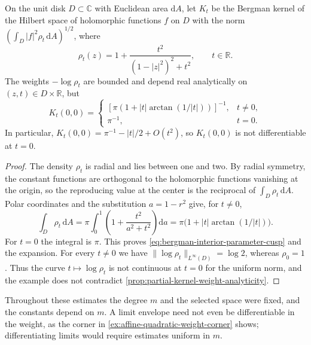 \begin{example}\label{ex:bergman-interior-parameter-cusp}
On the unit disk $D\subset\mathbb C$ with Euclidean area $\mathrm{d}A$, let $K_t$ be the Bergman kernel of the Hilbert space of holomorphic functions $f$ on $D$ with the norm $(\int_D|f|^2\rho_t\,\mathrm{d}A)^{1/2}$, where
\[
 \rho_t(z)=1+\frac{t^2}{(1-|z|^2)^2+t^2},\qquad t\in\mathbb R.
\]
The weights $-\log\rho_t$ are bounded and depend real analytically on $(z,t)\in D\times\mathbb R$, but
\begin{equation}\label{eq:bergman-interior-parameter-cusp}
 K_t(0,0)=
 \begin{cases}
 [\pi(1+|t|\arctan(1/|t|))]^{-1},&t\ne0,\\
 \pi^{-1},&t=0.
 \end{cases}
\end{equation}
In particular, $K_t(0,0)=\pi^{-1}-|t|/2+O(t^2)$, so $K_t(0,0)$ is not differentiable at $t=0$.
\end{example}
\begin{proof}
The density $\rho_t$ is radial and lies between one and two. By radial symmetry, the constant functions are orthogonal to the holomorphic functions vanishing at the origin, so the reproducing value at the center is the reciprocal of $\int_D\rho_t\,\mathrm{d}A$. Polar coordinates and the substitution $a=1-r^2$ give, for $t\ne0$,
\[
 \int_D\rho_t\,\mathrm{d}A
 =\pi\int_0^1\left(1+\frac{t^2}{a^2+t^2}\right)\mathrm{d}a
 =\pi\bigl(1+|t|\arctan(1/|t|)\bigr).
\]
For $t=0$ the integral is $\pi$. This proves \eqref{eq:bergman-interior-parameter-cusp} and the expansion. For every $t\ne0$ we have $\|\log\rho_t\|_{L^\infty(D)}=\log2$, whereas $\rho_0=1$. Thus the curve $t\mapsto\log\rho_t$ is not continuous at $t=0$ for the uniform norm, and the example does not contradict \cref{prop:partial-kernel-weight-analyticity}.
\end{proof}

Throughout these estimates the degree $m$ and the selected space were fixed, and the constants depend on $m$. A limit envelope need not even be differentiable in the weight, as the corner in \cref{ex:affine-quadratic-weight-corner} shows; differentiating limits would require estimates uniform in $m$.
